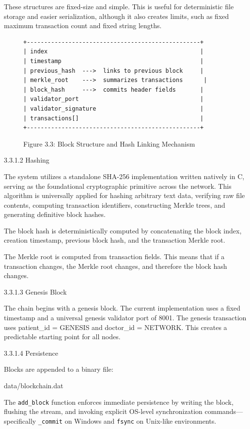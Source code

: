 \documentclass[12pt]{article}
\begin{document}
These structures are fixed-size and simple. This is useful for deterministic file storage and easier serialization, although it also creates limits, such as fixed maximum transaction count and fixed string lengths.

\begin{figure}[htbp]
\centering
\scriptsize
\begin{verbatim}
+--------------------------------------------------+
| index                                            |
| timestamp                                        |
| previous_hash  --->  links to previous block     |
| merkle_root    --->  summarizes transactions      |
| block_hash     --->  commits header fields       |
| validator_port                                   |
| validator_signature                              |
| transactions[]                                   |
+--------------------------------------------------+
\end{verbatim}
\label{fig:3.3}
\caption*{Figure 3.3: Block Structure and Hash Linking Mechanism}
\end{figure}

3.3.1.2 Hashing

The system utilizes a standalone SHA-256 implementation written natively in C, serving as the foundational cryptographic primitive across the network. This algorithm is universally applied for hashing arbitrary text data, verifying raw file contents, computing transaction identifiers, constructing Merkle trees, and generating definitive block hashes.

The block hash is deterministically computed by concatenating the block index, creation timestamp, previous block hash, and the transaction Merkle root.

The Merkle root is computed from transaction fields. This means that if a transaction changes, the Merkle root changes, and therefore the block hash changes.

3.3.1.3 Genesis Block

The chain begins with a genesis block. The current implementation uses a fixed timestamp and a universal genesis validator port of 8001. The genesis transaction uses patient\_id = GENESIS and doctor\_id = NETWORK. This creates a predictable starting point for all nodes.

3.3.1.4 Persistence

Blocks are appended to a binary file:

data/blockchain.dat

The \texttt{add\_block} function enforces immediate persistence by writing the block, flushing the stream, and invoking explicit OS-level synchronization commands—specifically \texttt{\_commit} on Windows and \texttt{fsync} on Unix-like environments.
\end{document}

